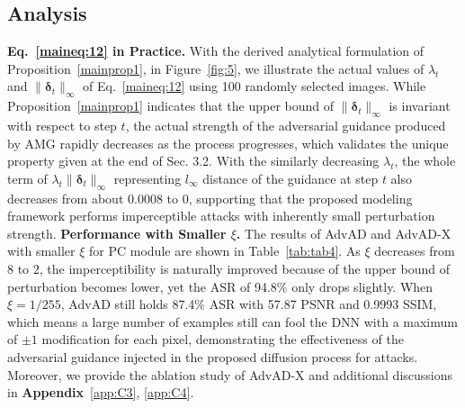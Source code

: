 \documentclass{article}
\begin{document}
\begin{figure}[t]
\begin{minipage}[t]{0.5\textwidth}
        \vspace{-0.2599cm}
    \end{minipage}
    \vspace{-0.2599cm}
\end{figure}





\subsection{Analysis}
\label{sec:4.5}


\textbf{Eq.~\eqref{maineq:12} in Practice.} With the derived analytical formulation of Proposition~\ref{mainprop1}, in Figure~\ref{fig:5}, we illustrate the actual values of $\lambda_t$ and $\|\boldsymbol{\delta}_t\|_\infty$ of Eq.~\eqref{maineq:12} using 100 randomly selected images. While Proposition~\ref{mainprop1} indicates that the upper bound of $\|\boldsymbol{\delta}_t\|_\infty$ is invariant with respect to step $t$, the actual strength of the adversarial guidance produced by AMG rapidly decreases as the process progresses, which validates the unique property given at the end of Sec. 3.2. With the similarly decreasing $\lambda_{t}$, the whole term of $\lambda_{t}\|\boldsymbol{\delta}_t\|_\infty$ representing $l_\infty$ distance of the guidance at step $t$ also decreases from about 0.0008 to 0, supporting that the proposed modeling framework performs imperceptible attacks with inherently small perturbation strength. \textbf{Performance with Smaller $\xi$.}  The results of AdvAD and AdvAD-X with smaller $\xi$ for PC module are shown in Table~\ref{tab:tab4}. As $\xi$ decreases from $8$ to $2$, the imperceptibility is naturally improved because of the upper bound of perturbation becomes lower, yet the ASR of 94.8\% only drops slightly. When $\xi=1/255$, AdvAD still holds 87.4\% ASR with 57.87 PSNR and 0.9993 SSIM, which means a large number of examples still can fool the DNN with a maximum of $\pm1$ modification for each pixel, demonstrating the effectiveness of the adversarial guidance injected in the proposed diffusion process for attacks. Moreover, we provide the ablation study of AdvAD-X and additional discussions in \textbf{Appendix}~\ref{app:C3}, \ref{app:C4}.
\end{document}
